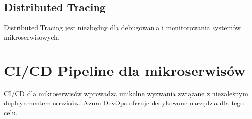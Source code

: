 \subsection{Distributed Tracing}
\label{subsec:DistributedTracing}

Distributed Tracing jest niezbędny dla debugowania i monitorowania systemów mikroserwisowych.

\section{CI/CD Pipeline dla mikroserwisów}
\label{sec:CICD}

CI/CD dla mikroserwisów wprowadza unikalne wyzwania związane z niezależnym deploynmentem serwisów. Azure DevOps oferuje dedykowane narzędzia dla tego celu.
